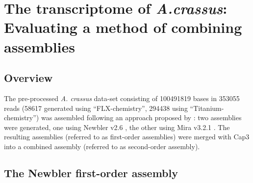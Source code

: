 \documentclass[12pt,a4paper]{article}
\begin{document}




\section{The transcriptome of \textit{A.crassus}: Evaluating a method of
  combining assemblies}



\subsection{Overview}
\label{sec:overview}

The pre-processed \textit{A. crassus} data-set consisting of
100491819 bases in 353055 reads (58617
generated using ``FLX-chemistry'', 294438 using
``Titanium-chemistry'') was assembled following an approach proposed
by \cite{pmid20950480}: two assemblies were generated, one using
Newbler v2.6 \cite{pmid16056220}, the other using Mira v3.2.1
\cite{miraEST}. The resulting assemblies (referred to as first-order
assemblies) were merged with Cap3 \cite{Cap3_Huang} into a combined
assembly (referred to as second-order assembly).


\subsection{The Newbler first-order assembly}
\label{sec:new-fist}
\end{document}
